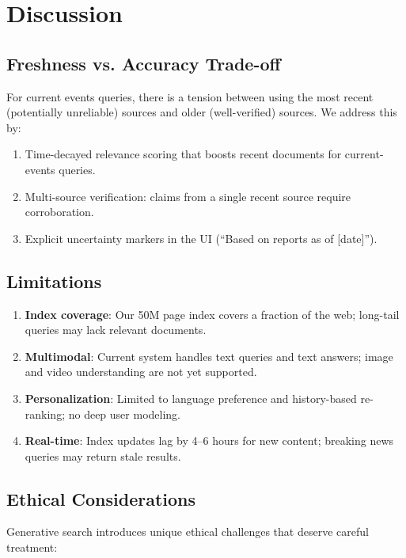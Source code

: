 \section{Discussion}

\label{sec:discussion}

\subsection{Freshness vs. Accuracy Trade-off}

For current events queries, there is a tension between using the most recent (potentially unreliable) sources and older (well-verified) sources. We address this by:
\begin{enumerate}[leftmargin=1.4em]
    \item Time-decayed relevance scoring that boosts recent documents for current-events queries.
    \item Multi-source verification: claims from a single recent source require corroboration.
    \item Explicit uncertainty markers in the UI (``Based on reports as of [date]'').
\end{enumerate}

\subsection{Limitations}

\begin{enumerate}[leftmargin=1.4em]
    \item \textbf{Index coverage}: Our 50M page index covers a fraction of the web; long-tail queries may lack relevant documents.
    \item \textbf{Multimodal}: Current system handles text queries and text answers; image and video understanding are not yet supported.
    \item \textbf{Personalization}: Limited to language preference and history-based re-ranking; no deep user modeling.
    \item \textbf{Real-time}: Index updates lag by 4--6 hours for new content; breaking news queries may return stale results.
\end{enumerate}

\subsection{Ethical Considerations}

Generative search introduces unique ethical challenges that deserve careful treatment:

